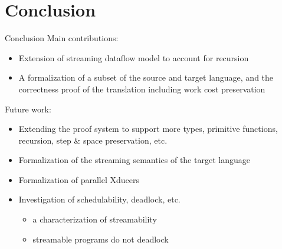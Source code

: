 \documentclass{beamer}
\begin{document}


\section{Conclusion}

\begin{frame}{Conclusion}
\small
	Main contributions:
	\begin{itemize}
		\item Extension of streaming dataflow model to account for recursion 
		\item A formalization of a subset of the source and target language, and the correctness proof of the translation including work cost preservation
	\end{itemize}

	Future work:
	\begin{itemize}
	\item Extending the proof system to support more types, primitive functions, recursion, step \& space preservation, etc.
	\item Formalization of the streaming semantics of the target language
	\item Formalization of parallel Xducers
	\item Investigation of schedulability, deadlock, etc.
	  \begin{itemize}
	  	\item a characterization of streamability 
	  	\item streamable programs do not deadlock
	  \end{itemize}
	\end{itemize}
\end{frame}

\end{document}
